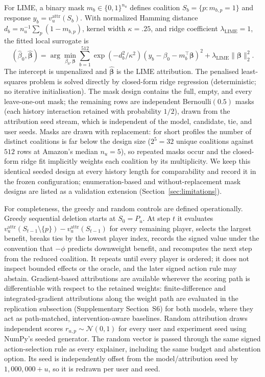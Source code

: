 \documentclass[a4paper,fleqn,doubleblind]{cas-sc}
\begin{document}
For LIME, a binary mask $m_b\in\{0,1\}^{n_u}$ defines coalition $S_b=\{p:m_{b,p}=1\}$ and response $y_b=v_u^{\mathrm{attr}}(S_b)$. With normalized Hamming distance $d_b=n_u^{-1}\sum_p(1-m_{b,p})$, kernel width $\kappa=.25$, and ridge coefficient $\lambda_{\mathrm{LIME}}=1$, the fitted local surrogate is
\begin{equation}
(\hat\beta_0,\hat{\boldsymbol\beta})=\arg\min_{\beta_0,\boldsymbol\beta}
\sum_{b=1}^{512}\exp\left(-d_b^2/\kappa^2\right)\left(y_b-\beta_0-m_b^{\top}\boldsymbol\beta\right)^2
+\lambda_{\mathrm{LIME}}\lVert\boldsymbol\beta\rVert_2^2.
\label{eq:lime}
\end{equation}
The intercept is unpenalized and $\hat{\boldsymbol\beta}$ is the LIME attribution. The penalised least-squares problem is solved directly by closed-form ridge regression (deterministic; no iterative initialisation). The mask design contains the full, empty, and every leave-one-out mask; the remaining rows are independent Bernoulli$(0.5)$ masks (each history interaction retained with probability $1/2$), drawn from the attribution seed stream, which is independent of the model, candidate, tie, and user seeds. Masks are drawn with replacement: for short profiles the number of distinct coalitions is far below the design size ($2^5=32$ unique coalitions against $512$ rows at Amazon's median $n_u=5$), so repeated masks occur and the closed-form ridge fit implicitly weights each coalition by its multiplicity. We keep this identical seeded design at every history length for comparability and record it in the frozen configuration; enumeration-based and without-replacement mask designs are listed as a validation extension (Section~\ref{sec:limitations}).

For completeness, the greedy and random controls are defined operationally. Greedy sequential deletion starts at $S_0=P_u$. At step $t$ it evaluates $v_u^{\mathrm{attr}}(S_{t-1}\setminus\{p\})-v_u^{\mathrm{attr}}(S_{t-1})$ for every remaining player, selects the largest benefit, breaks ties by the lowest player index, records the signed value under the convention that $-\phi$ predicts downweight benefit, and recomputes the next step from the reduced coalition. It repeats until every player is ordered; it does not inspect bounded effects or the oracle, and the later signed action rule may abstain. Gradient-based attributions are available wherever the scoring path is differentiable with respect to the retained weights: finite-difference and integrated-gradient attributions along the weight path are evaluated in the replication subsection (Supplementary Section~S6) for both models, where they act as path-matched, intervention-aware baselines. Random attribution draws independent scores $r_{u,p}\sim\mathcal{N}(0,1)$ for every user and experiment seed using NumPy's seeded generator. The random vector is passed through the same signed action-selection rule as every explainer, including the same budget and abstention option. Its seed is independently offset from the model/attribution seed by $1{,}000{,}000+u$, so it is redrawn per user and seed.
\end{document}

